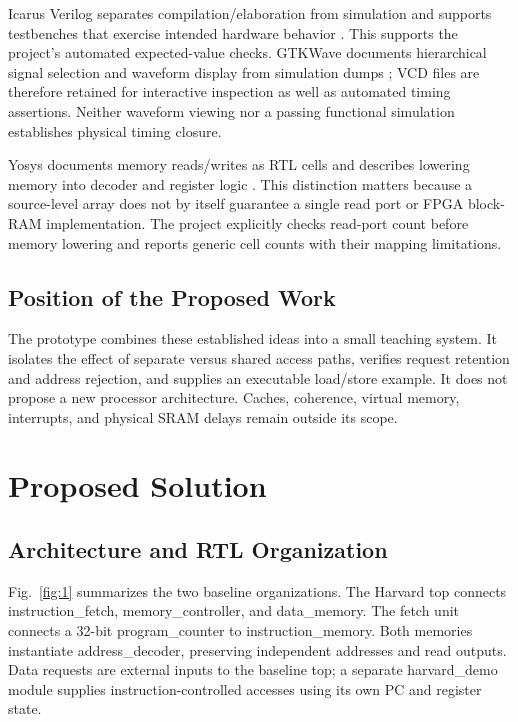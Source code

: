 \documentclass[conference,letterpaper]{IEEEtran}
\begin{document}
Icarus Verilog separates compilation/elaboration from simulation and supports testbenches that exercise intended hardware behavior \cite{ref4}. This supports the project's automated expected-value checks. GTKWave documents hierarchical signal selection and waveform display from simulation dumps \cite{ref5}; VCD files are therefore retained for interactive inspection as well as automated timing assertions. Neither waveform viewing nor a passing functional simulation establishes physical timing closure.

Yosys documents memory reads/writes as RTL cells and describes lowering memory into decoder and register logic \cite{ref6}. This distinction matters because a source-level array does not by itself guarantee a single read port or FPGA block-RAM implementation. The project explicitly checks read-port count before memory lowering and reports generic cell counts with their mapping limitations.

\subsection{Position of the Proposed Work}

The prototype combines these established ideas into a small teaching system. It isolates the effect of separate versus shared access paths, verifies request retention and address rejection, and supplies an executable load/store example. It does not propose a new processor architecture. Caches, coherence, virtual memory, interrupts, and physical SRAM delays remain outside its scope.

\section{Proposed Solution}

\subsection{Architecture and RTL Organization}

Fig.~\ref{fig:1} summarizes the two baseline organizations. The Harvard top connects instruction\_fetch, memory\_controller, and data\_memory. The fetch unit connects a 32-bit program\_counter to instruction\_memory. Both memories instantiate address\_decoder, preserving independent addresses and read outputs. Data requests are external inputs to the baseline top; a separate harvard\_demo module supplies instruction-controlled accesses using its own PC and register state.
\end{document}
